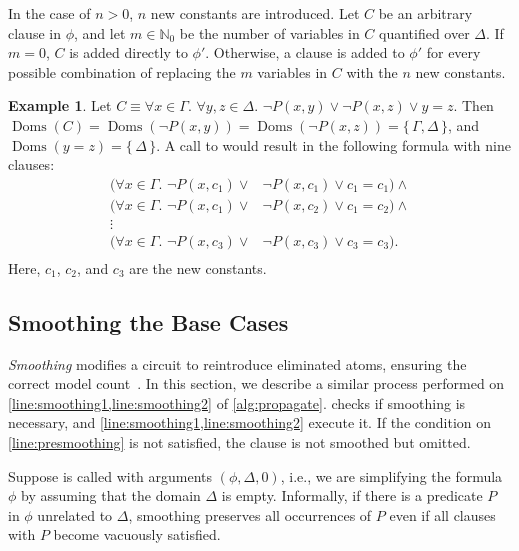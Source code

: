 \documentclass[letterpaper]{article} %
\theoremstyle{remark}
\theoremstyle{definition}
\newtheorem{example}{Example}
\DeclareMathOperator{\Doms}{Doms}
\begin{document}
In the case of $n>0$, $n$ new constants are introduced. Let $C$ be an arbitrary
clause in $\phi$, and let $m \in \mathbb{N}_{0}$ be the number of variables in
$C$ quantified over $\Delta$. If $m=0$, $C$ is added directly to $\phi'$.
Otherwise, a clause is added to $\phi'$ for every possible combination of
replacing the $m$ variables in $C$ with the $n$ new constants.

\begin{example}
  Let $C \equiv \forall x \in \Gamma\text{. }\forall y, z \in \Delta\text{.
  } \neg P(x, y) \lor \neg P(x, z) \lor y=z$. Then
  $\Doms(C) = \Doms(\neg P(x, y)) = \Doms(\neg P(x, z)) = \{\, \Gamma, \Delta \,\}$,
  and $\Doms(y=z) = \{\, \Delta \,\}$. A call to  would result in the following formula with nine clauses:
  \begin{align*}
    (\forall x \in \Gamma\text{. }\neg P(x, c_{1}) \lor& \neg P(x, c_{1}) \lor c_{1}=c_{1})\land{}\\
    (\forall x \in \Gamma\text{. }\neg P(x, c_{1}) \lor& \neg P(x, c_{2}) \lor c_{1}=c_{2})\land{}\\
    \vdots&\\
    (\forall x \in \Gamma\text{. }\neg P(x, c_{3}) \lor& \neg P(x, c_{3}) \lor c_{3}=c_{3}).\\
  \end{align*}
  Here, $c_{1}$, $c_{2}$, and $c_{3}$ are the new constants.
\end{example}

\subsection{Smoothing the Base Cases}\label{sec:smoothing}

\emph{Smoothing} modifies a circuit to reintroduce eliminated atoms, ensuring
the correct model
count~\cite{darwiche2001tractable,DBLP:conf/ijcai/BroeckTMDR11}. In this
section, we describe a similar process performed on
\cref{line:smoothing1,line:smoothing2} of \cref{alg:propagate}.
 checks if smoothing is necessary, and
\cref{line:smoothing1,line:smoothing2} execute it. If the condition on
\cref{line:presmoothing} is not satisfied, the clause is not smoothed but
omitted.

Suppose \Propagate is called with arguments $(\phi, \Delta, 0)$, i.e., we are
simplifying the formula $\phi$ by assuming that the domain $\Delta$ is empty.
Informally, if there is a predicate $P$ in $\phi$ unrelated to $\Delta$,
smoothing preserves all occurrences of $P$ even if all clauses with $P$ become
vacuously satisfied.
\end{document}
